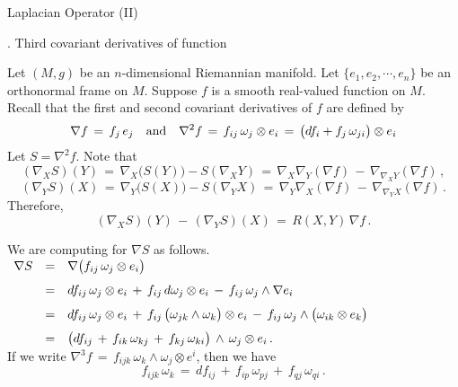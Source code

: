 \documentclass{article}[12pt,a4paper]
\begin{document}

\pagestyle{empty}
\begin{center} Laplacian Operator (II) \end{center}

\begin{center} {. Third covariant derivatives of function}\end{center}
Let $(M, g)$ be an $n$-dimensional Riemannian manifold. 
Let $\{e_1, e_2, \cdots, e_n\}$ be an orthonormal frame on $M$. 
Suppose $f$ is a smooth real-valued function on $M$. 
Recall that the first and second covariant derivatives of $f$ are defined by
$$ \nabla f \,=\, f_j \, e_j \quad \mbox{and} \quad 
\nabla^2 f \,=\, f_{ij}\, \omega_j \otimes e_i \,=\, \big(df_i + f_j\, \omega_{ji}\big)\otimes e_i $$
Let $S=\nabla^2 f$. Note that 
$$ (\nabla_X S)(Y) \,=\, \nabla_X\big(S(Y)\big) - S(\nabla_X Y) \,=\, 
	\nabla_X \nabla_Y(\nabla f) \,-\, \nabla_{\nabla_X Y}(\nabla f)\,,$$
$$ (\nabla_Y S)(X) \,=\, \nabla_Y\big(S(X)\big) - S(\nabla_Y X) \,=\, 
	\nabla_Y \nabla_X(\nabla f) \,-\, \nabla_{\nabla_Y X}(\nabla f)\,. $$
Therefore,
\begin{equation}
(\nabla_X S)(Y) \,-\, (\nabla_Y S)(X) \,=\, R(X, Y)\,\nabla f\,.
\end{equation}
\vspace*{0.1in}

We are computing for $\nabla S$ as follows. \\[0.1in]
$\begin{array}{rcl}
\nabla S &=& \displaystyle \nabla \big(f_{ij}\, \omega_j \otimes e_i\big) \\[0.1in] 
&=& \displaystyle 
	df_{ij}\, \omega_j \otimes e_i \,+\, f_{ij}\, d\omega_j \otimes e_i 
	\,-\, f_{ij}\, \omega_j \wedge \nabla e_i \\[0.1in]
&=& \displaystyle 
	df_{ij}\, \omega_j \otimes e_i \,+\, f_{ij}\, \big(\omega_{jk} \wedge \omega_k\big) \otimes e_i
	\,-\, f_{ij}\, \omega_j \wedge \big( \omega_{ik} \otimes e_k\big) \\[0.1in]
&=& \displaystyle 
	\big( df_{ij} \,+\, f_{ik}\, \omega_{kj} \,+\, f_{kj}\, \omega_{ki} \big)\,\wedge\, \omega_j \otimes e_i \,.
\end{array}$ \\[0.1in]

If we write $\nabla^3 f \,=\, f_{ijk}\,\omega_k \wedge \omega_j \otimes e^i$, then we have
\begin{equation}
f_{ijk}\,\omega_k \,=\,  df_{ij} \,+\, f_{ip}\, \omega_{pj} \,+\, f_{qj}\, \omega_{qi} \,.
\end{equation}
\vspace*{0.1in}
\end{document}
